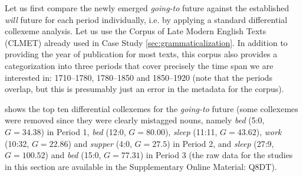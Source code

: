 Let us first compare the newly emerged \textit{going\hyp{}to}  future against the established \textit{will} future for each period individually, i.e. by applying a standard differential collexeme  analysis. Let us use the Corpus of Late Modern English Texts (CLMET)  already used in Case Study \ref{sec:grammaticalization}. In addition to providing the year of publication for most texts, this corpus also provides a categorization  into three periods that cover precisely the time span we are interested in: 1710--1780, 1780--1850 and 1850--1920 (note that the periods overlap, but this is presumably just an error in the metadata  for the corpus).

 shows the top ten differential collexemes  for the \textit{going\hyp{}to}  future (some collexemes were removed since they were clearly mistagged nouns,  name\-ly \textit{bed} (5:0, $G = 34.38$) in Period 1, \textit{bed} (12:0, $G = 80.00$), \textit{sleep} (11:11, $G = 43.62$), \textit{work} (10:32, $G = 22.86$) and \textit{supper} (4:0, $G = 27.5$) in Period 2, and \textit{sleep} (27:9, $G = 100.52$) and \textit{bed} (15:0, $G = 77.31$) in Period 3 (the raw data for the studies in this section are available in the Supplementary Online Material: Q8DT).

